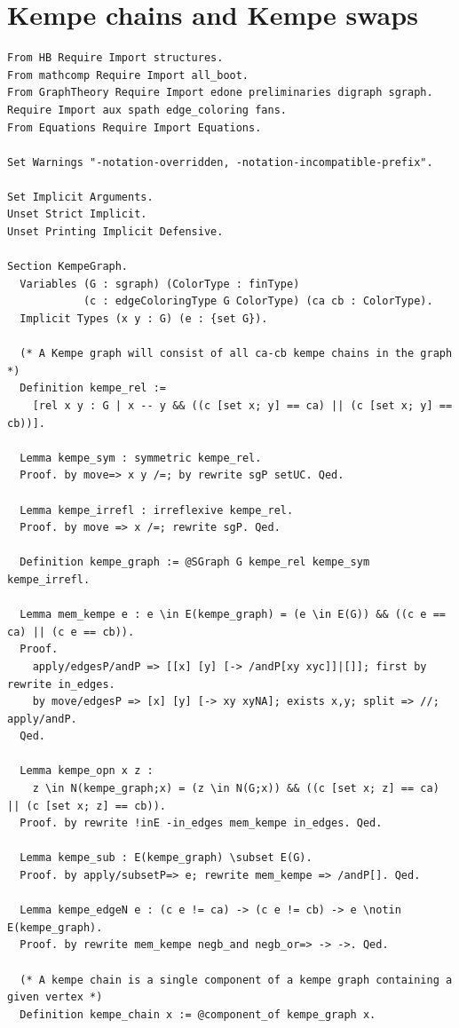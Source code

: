 \section{Kempe chains and Kempe swaps}\label{apdx:kempe}
\begin{verbatim}
From HB Require Import structures.
From mathcomp Require Import all_boot.
From GraphTheory Require Import edone preliminaries digraph sgraph.
Require Import aux spath edge_coloring fans.
From Equations Require Import Equations.

Set Warnings "-notation-overridden, -notation-incompatible-prefix".

Set Implicit Arguments.
Unset Strict Implicit.
Unset Printing Implicit Defensive.

Section KempeGraph.
  Variables (G : sgraph) (ColorType : finType) 
            (c : edgeColoringType G ColorType) (ca cb : ColorType).
  Implicit Types (x y : G) (e : {set G}).

  (* A Kempe graph will consist of all ca-cb kempe chains in the graph *)
  Definition kempe_rel := 
    [rel x y : G | x -- y && ((c [set x; y] == ca) || (c [set x; y] == cb))].

  Lemma kempe_sym : symmetric kempe_rel.  
  Proof. by move=> x y /=; by rewrite sgP setUC. Qed. 
         
  Lemma kempe_irrefl : irreflexive kempe_rel.  
  Proof. by move => x /=; rewrite sgP. Qed.

  Definition kempe_graph := @SGraph G kempe_rel kempe_sym kempe_irrefl.

  Lemma mem_kempe e : e \in E(kempe_graph) = (e \in E(G)) && ((c e == ca) || (c e == cb)).
  Proof.
    apply/edgesP/andP => [[x] [y] [-> /andP[xy xyc]]|[]]; first by rewrite in_edges.
    by move/edgesP => [x] [y] [-> xy xyNA]; exists x,y; split => //; apply/andP.  
  Qed.

  Lemma kempe_opn x z : 
    z \in N(kempe_graph;x) = (z \in N(G;x)) && ((c [set x; z] == ca) || (c [set x; z] == cb)).
  Proof. by rewrite !inE -in_edges mem_kempe in_edges. Qed.

  Lemma kempe_sub : E(kempe_graph) \subset E(G).
  Proof. by apply/subsetP=> e; rewrite mem_kempe => /andP[]. Qed.

  Lemma kempe_edgeN e : (c e != ca) -> (c e != cb) -> e \notin E(kempe_graph).
  Proof. by rewrite mem_kempe negb_and negb_or=> -> ->. Qed.
    
  (* A kempe chain is a single component of a kempe graph containing a given vertex *)
  Definition kempe_chain x := @component_of kempe_graph x.


\end{verbatim}
